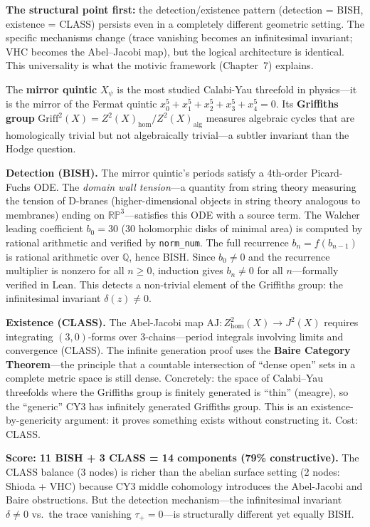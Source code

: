 \documentclass[11pt,twoside,openany]{report}
\theoremstyle{remark}
\newcommand{\BISH}{\textsf{BISH}}
\newcommand{\CLASS}{\textsf{CLASS}}
\begin{document}
\textbf{The structural point first:} the detection/existence pattern (detection = \BISH, existence = \CLASS) persists even in a completely different geometric setting. The specific mechanisms change (trace vanishing becomes an infinitesimal invariant; VHC becomes the Abel--Jacobi map), but the logical architecture is identical. This universality is what the motivic framework (Chapter~7) explains.

The \textbf{mirror quintic} $X_\psi$ is the most studied Calabi-Yau threefold in physics---it is the mirror of the Fermat quintic $x_0^5 + x_1^5 + x_2^5 + x_3^5 + x_4^5 = 0$. Its \textbf{Griffiths group} $\mathrm{Griff}^2(X) = Z^2(X)_{\mathrm{hom}} / Z^2(X)_{\mathrm{alg}}$ measures algebraic cycles that are homologically trivial but not algebraically trivial---a subtler invariant than the Hodge question.

\textbf{Detection (\BISH).} The mirror quintic's periods satisfy a 4th-order Picard-Fuchs ODE. The \emph{domain wall tension}---a quantity from string theory measuring the tension of D-branes (higher-dimensional objects in string theory analogous to membranes) ending on $\mathbb{R}\mathbb{P}^3$---satisfies this ODE with a source term. The Walcher leading coefficient $b_0 = 30$ (30 holomorphic disks of minimal area) is computed by rational arithmetic and verified by \texttt{norm\_num}. The full recurrence $b_n = f(b_{n-1})$ is rational arithmetic over $\mathbb{Q}$, hence \BISH. Since $b_0 \neq 0$ and the recurrence multiplier is nonzero for all $n \geq 0$, induction gives $b_n \neq 0$ for all $n$---formally verified in Lean. This detects a non-trivial element of the Griffiths group: the infinitesimal invariant $\delta(z) \neq 0$.

\textbf{Existence (\CLASS).} The Abel-Jacobi map $\mathrm{AJ}: Z^2_{\mathrm{hom}}(X) \to J^2(X)$ requires integrating $(3,0)$-forms over 3-chains---period integrals involving limits and convergence (\CLASS). The infinite generation proof uses the \textbf{Baire Category Theorem}---the principle that a countable intersection of ``dense open'' sets in a complete metric space is still dense. Concretely: the space of Calabi--Yau threefolds where the Griffiths group is finitely generated is ``thin'' (meagre), so the ``generic'' CY3 has infinitely generated Griffiths group. This is an existence-by-genericity argument: it proves something exists without constructing it. Cost: \CLASS.

\textbf{Score: 11 \BISH{} + 3 \CLASS{} = 14 components (79\% constructive).} The \CLASS{} balance (3 nodes) is richer than the abelian surface setting (2 nodes: Shioda + VHC) because CY3 middle cohomology introduces the Abel-Jacobi and Baire obstructions. But the detection mechanism---the infinitesimal invariant $\delta \neq 0$ vs.\ the trace vanishing $\tau_+ = 0$---is structurally different yet equally \BISH.
\end{document}
